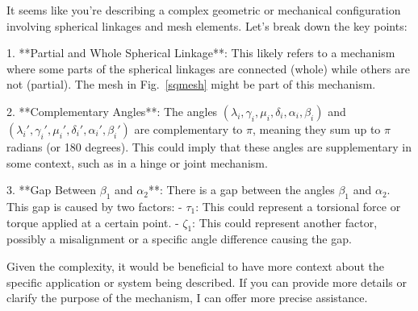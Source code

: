 It seems like you're describing a complex geometric or mechanical configuration involving spherical linkages and mesh elements. Let's break down the key points:

1. **Partial and Whole Spherical Linkage**: This likely refers to a mechanism where some parts of the spherical linkages are connected (whole) while others are not (partial). The mesh in Fig.~\ref{sqmesh} might be part of this mechanism.

2. **Complementary Angles**: The angles \((\lambda_i, \gamma_i, \mu_i, \delta_i, \alpha_i, \beta_i)\) and \((\lambda_i', \gamma_i', \mu_i', \delta_i', \alpha_i', \beta_i')\) are complementary to \(\pi\), meaning they sum up to \(\pi\) radians (or 180 degrees). This could imply that these angles are supplementary in some context, such as in a hinge or joint mechanism.

3. **Gap Between \(\beta_1\) and \(\alpha_2\)**: There is a gap between the angles \(\beta_1\) and \(\alpha_2\). This gap is caused by two factors:
   - \(\tau_1\): This could represent a torsional force or torque applied at a certain point.
   - \(\zeta_1\): This could represent another factor, possibly a misalignment or a specific angle difference causing the gap.

Given the complexity, it would be beneficial to have more context about the specific application or system being described. If you can provide more details or clarify the purpose of the mechanism, I can offer more precise assistance.